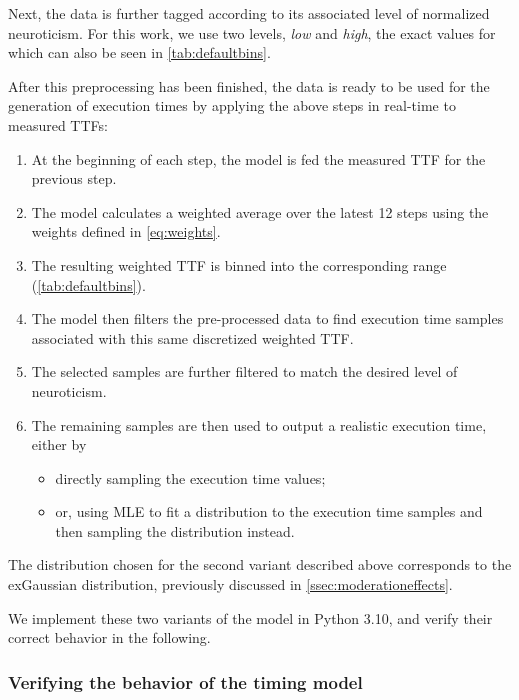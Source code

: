 Next, the data is further tagged according to its associated level of normalized neuroticism.
For this work, we use two levels, \emph{low} and \emph{high}, the exact values for which can also be seen in \cref{tab:defaultbins}.

After this preprocessing has been finished, the data is ready to be used for the generation of execution times by applying the above steps in real-time to measured \acp{TTF}:

\begin{enumerate}
    \item At the beginning of each step, the model is fed the measured \ac{TTF} for the previous step.
    \item The model calculates a weighted average over the latest \num{12} steps using the weights defined in \cref{eq:weights}.
    \item The resulting weighted \ac{TTF} is binned into the corresponding range (\cref{tab:defaultbins}).
    \item The model then filters the pre-processed data to find execution time samples associated with this same discretized weighted \ac{TTF}.
    \item The selected samples are further filtered to match the desired level of neuroticism.
    \item The remaining samples are then used to output a realistic execution time, either by
    \begin{itemize}
        \item directly sampling the execution time values;
        \item or, using \ac{MLE} to fit a distribution to the execution time samples and then sampling the distribution instead.
    \end{itemize}
\end{enumerate}

The distribution chosen for the second variant described above corresponds to the \ac{exGaussian} distribution, previously discussed in \cref{ssec:moderationeffects}.

We implement these two variants of the model in Python 3.10, and verify their correct behavior in the following.

\subsubsection{Verifying the behavior of the timing model}\label{ssec:model:verification}

